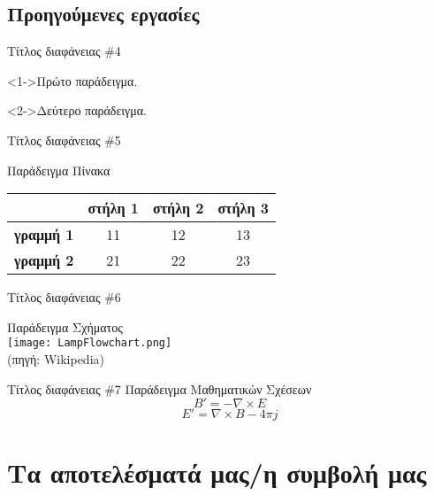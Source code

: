 \documentclass[greek]{beamer}
\begin{document}
\subsection{Προηγούμενες εργασίες}

\begin{frame}{Τίτλος διαφάνειας \textlatin{\#}4}
	\begin{example}
		<1->Πρώτο παράδειγμα. 
	\end{example}
	\begin{example}
		<2->Δεύτερο παράδειγμα.
	\end{example}
\end{frame}

\begin{frame}{Τίτλος διαφάνειας \textlatin{\#}5}
	\begin{center}
		Παράδειγμα Πίνακα \\[12pt]
		\begin{tabular}{c||c|c|c|}
			& \textbf{στήλη 1} & \textbf{στήλη  2} & \textbf{στήλη 3} \\
			\hline
			\hline
			\textbf{γραμμή 1} & 11 & 12 & 13 \\
			\hline
			\textbf{γραμμή 2} & 21 & 22 & 23 \\
		\end{tabular}
    \end{center}
\end{frame}

\begin{frame}{Τίτλος διαφάνειας \textlatin{\#}6}
	\begin{center}
		Παράδειγμα Σχήματος \\[12pt]
		\texttt{[image: LampFlowchart.png]}
		\\
		\footnotesize(πηγή: \textlatin{Wikipedia})
    \end{center}
\end{frame}

\begin{frame}{Τίτλος διαφάνειας \textlatin{\#}7}
	\centering
	Παράδειγμα Μαθηματικών Σχέσεων \\[12pt]
	\begin{equation}
        	B'=-\nabla \times E
	\end{equation}
	\begin{equation*}
        	E'=\nabla \times B - 4\pi j
	\end{equation*}
\end{frame}

\section{Τα αποτελέσματά μας/η συμβολή μας}
\end{document}
